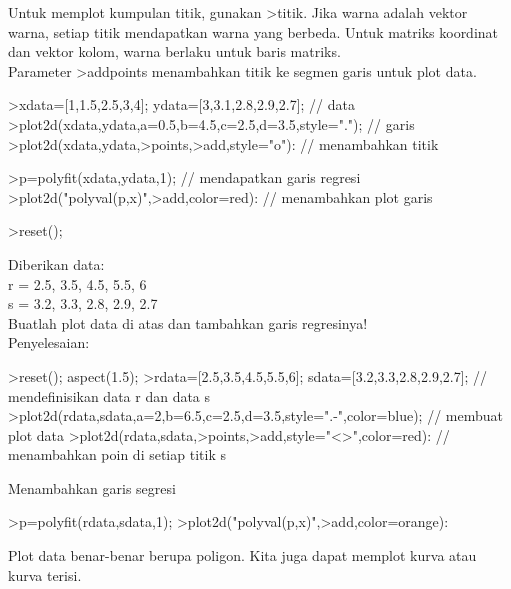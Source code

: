 \documentclass{article}
\begin{document}
\begin{eulernotebook}
\begin{eulercomment}
\begin{eulercomment}
\begin{eulercomment}
\begin{eulercomment}
\begin{eulercomment}
\begin{eulercomment}
\begin{eulercomment}
Untuk memplot kumpulan titik, gunakan \textgreater{}titik. Jika warna adalah vektor
warna, setiap titik mendapatkan warna yang berbeda. Untuk matriks
koordinat dan vektor kolom, warna berlaku untuk baris matriks. \\
Parameter \textgreater{}addpoints menambahkan titik ke segmen garis untuk plot
data.
\end{eulercomment}
\begin{eulerprompt}
>xdata=[1,1.5,2.5,3,4]; ydata=[3,3.1,2.8,2.9,2.7]; // data
>plot2d(xdata,ydata,a=0.5,b=4.5,c=2.5,d=3.5,style="."); // garis
>plot2d(xdata,ydata,>points,>add,style="o"): // menambahkan titik
\end{eulerprompt}
\begin{eulerprompt}
>p=polyfit(xdata,ydata,1); // mendapatkan garis regresi
>plot2d("polyval(p,x)",>add,color=red): // menambahkan plot garis
\end{eulerprompt}
\begin{eulerprompt}
>reset();
\end{eulerprompt}
\eulersubheading{}
\begin{eulercomment}
Diberikan data:\\
r = 2.5, 3.5, 4.5, 5.5, 6\\
s = 3.2, 3.3, 2.8, 2.9, 2.7\\
Buatlah plot data di atas dan tambahkan garis regresinya!\\
Penyelesaian:
\end{eulercomment}
\begin{eulerprompt}
>reset(); aspect(1.5);
>rdata=[2.5,3.5,4.5,5.5,6]; sdata=[3.2,3.3,2.8,2.9,2.7]; // mendefinisikan data r dan data s
>plot2d(rdata,sdata,a=2,b=6.5,c=2.5,d=3.5,style=".-",color=blue); // membuat plot data
>plot2d(rdata,sdata,>points,>add,style="<>",color=red): // menambahkan poin di setiap titik s
\end{eulerprompt}
\begin{eulercomment}
Menambahkan garis segresi
\end{eulercomment}
\begin{eulerprompt}
>p=polyfit(rdata,sdata,1);
>plot2d("polyval(p,x)",>add,color=orange):
\end{eulerprompt}
\begin{eulercomment}
\begin{eulercomment}
\begin{eulercomment}
Plot data benar-benar berupa poligon. Kita juga dapat memplot kurva
atau kurva terisi.


\end{eulercomment}
\end{eulercomment}
\end{eulercomment}
\end{eulercomment}
\end{eulercomment}
\end{eulercomment}
\end{eulercomment}
\end{eulercomment}
\end{eulercomment}
\end{eulernotebook}
\end{document}
